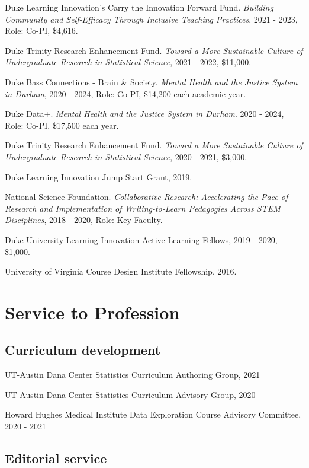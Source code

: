 \documentclass[11pt,dvipsnames]{article}
\begin{document}
Duke Learning Innovation's Carry the Innovation Forward Fund.
\emph{Building Community and Self-Efficacy Through Inclusive Teaching
Practices}, 2021 - 2023, Role: Co-PI, \$4,616.

Duke Trinity Research Enhancement Fund. \emph{Toward a More Sustainable
Culture of Undergraduate Research in Statistical Science}, 2021 - 2022,
\$11,000.

Duke Bass Connections - Brain \& Society. \emph{Mental Health and the
Justice System in Durham}, 2020 - 2024, Role: Co-PI, \$14,200 each
academic year.

Duke Data+. \emph{Mental Health and the Justice System in Durham}. 2020
- 2024, Role: Co-PI, \$17,500 each year.

Duke Trinity Research Enhancement Fund. \emph{Toward a More Sustainable
Culture of Undergraduate Research in Statistical Science}, 2020 - 2021,
\$3,000.

Duke Learning Innovation Jump Start Grant, 2019.

National Science Foundation. \emph{Collaborative Research: Accelerating
the Pace of Research and Implementation of Writing-to-Learn Pedagogies
Across STEM Disciplines}, 2018 - 2020, Role: Key Faculty.

Duke University Learning Innovation Active Learning Fellows, 2019 -
2020, \$1,000.

University of Virginia Course Design Institute Fellowship, 2016.

\hypertarget{service-to-profession}{%
\section{Service to Profession}\label{service-to-profession}}

\hypertarget{curriculum-development}{%
\subsection{Curriculum development}\label{curriculum-development}}

UT-Austin Dana Center Statistics Curriculum Authoring Group, 2021

UT-Austin Dana Center Statistics Curriculum Advisory Group, 2020

Howard Hughes Medical Institute Data Exploration Course Advisory
Committee, 2020 - 2021

\hypertarget{editorial-service}{%
\subsection{Editorial service}\label{editorial-service}}
\end{document}
